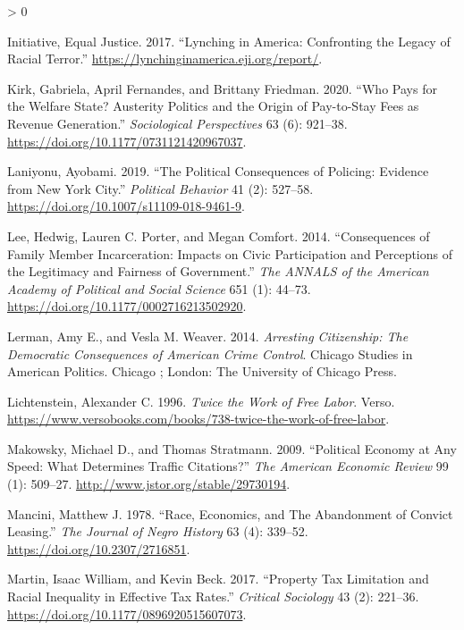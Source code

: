 \documentclass[
  12pt,
]{article}
\newlength{\cslhangindent}
\newenvironment{CSLReferences}[2] %
 {%
  \setlength{\parindent}{0pt}
  \ifodd #1 \everypar{\setlength{\hangindent}{\cslhangindent}}\ignorespaces\fi
  \ifnum #2 > 0
  \setlength{\parskip}{#2\baselineskip}
  \fi
 }%
 {}
\begin{document}
\begin{CSLReferences}{1}{0}
\leavevmode\hypertarget{ref-EqualJusticeInitiative2017}{}%
Initiative, Equal Justice. 2017. {``Lynching in {America}: {Confronting} the {Legacy} of {Racial Terror}.''} \url{https://lynchinginamerica.eji.org/report/}.

\leavevmode\hypertarget{ref-Kirk2020}{}%
Kirk, Gabriela, April Fernandes, and Brittany Friedman. 2020. {``Who {Pays} for the {Welfare State}? {Austerity Politics} and the {Origin} of {Pay}-to-{Stay Fees} as {Revenue Generation}.''} \emph{Sociological Perspectives} 63 (6): 921--38. \url{https://doi.org/10.1177/0731121420967037}.

\leavevmode\hypertarget{ref-Laniyonu2019}{}%
Laniyonu, Ayobami. 2019. {``The {Political Consequences} of {Policing}: {Evidence} from {New York City}.''} \emph{Political Behavior} 41 (2): 527--58. \url{https://doi.org/10.1007/s11109-018-9461-9}.

\leavevmode\hypertarget{ref-Lee2014}{}%
Lee, Hedwig, Lauren C. Porter, and Megan Comfort. 2014. {``Consequences of {Family Member Incarceration}: {Impacts} on {Civic Participation} and {Perceptions} of the {Legitimacy} and {Fairness} of {Government}.''} \emph{The ANNALS of the American Academy of Political and Social Science} 651 (1): 44--73. \url{https://doi.org/10.1177/0002716213502920}.

\leavevmode\hypertarget{ref-Lerman2014}{}%
Lerman, Amy E., and Vesla M. Weaver. 2014. \emph{Arresting Citizenship: The Democratic Consequences of {American} Crime Control}. Chicago Studies in {American} Politics. {Chicago ; London}: {The University of Chicago Press}.

\leavevmode\hypertarget{ref-Lichtenstein1996}{}%
Lichtenstein, Alexander C. 1996. \emph{Twice the {Work} of {Free Labor}}. {Verso}. \url{https://www.versobooks.com/books/738-twice-the-work-of-free-labor}.

\leavevmode\hypertarget{ref-Makowsky2009}{}%
Makowsky, Michael D., and Thomas Stratmann. 2009. {``Political {Economy} at {Any Speed}: {What Determines Traffic Citations}?''} \emph{The American Economic Review} 99 (1): 509--27. \url{http://www.jstor.org/stable/29730194}.

\leavevmode\hypertarget{ref-Mancini1978}{}%
Mancini, Matthew J. 1978. {``Race, {Economics}, and {The Abandonment} of {Convict Leasing}.''} \emph{The Journal of Negro History} 63 (4): 339--52. \url{https://doi.org/10.2307/2716851}.

\leavevmode\hypertarget{ref-Martin2017}{}%
Martin, Isaac William, and Kevin Beck. 2017. {``Property {Tax Limitation} and {Racial Inequality} in {Effective Tax Rates}.''} \emph{Critical Sociology} 43 (2): 221--36. \url{https://doi.org/10.1177/0896920515607073}.


\end{CSLReferences}
\end{document}
